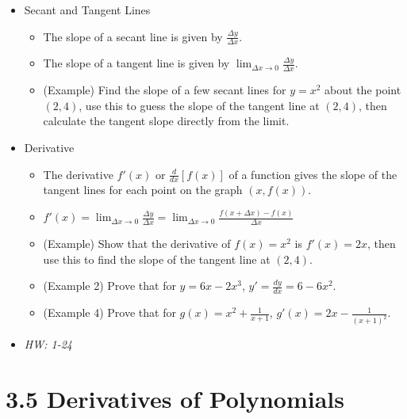 \documentclass[11pt]{article}
\begin{document}
\begin{itemize}
\item Secant and Tangent Lines
  \begin{itemize}
    \item The slope of a secant line is given by \(\frac{\Delta y}{\Delta x}\).
    \item The slope of a tangent line is given by
          \(\lim_{\Delta x\to 0}\frac{\Delta y}{\Delta x}\).
    \item (Example) Find the slope of a few secant lines for \(y=x^2\) about the
          point \((2,4)\), use this to guess the slope of the tangent line
          at \((2,4)\), then calculate the tangent slope directly from the limit.
  \end{itemize}
\item Derivative
  \begin{itemize}
    \item The derivative \(f'(x)\) or \(\frac{d}{dx}[f(x)]\) of a function
          gives the slope of the tangent lines for each point on the graph
          \((x,f(x))\).
    \item \(f'(x)=\lim_{\Delta x\to 0}\frac{\Delta y}{\Delta x}=
            \lim_{\Delta x\to 0}\frac{f(x+\Delta x)-f(x)}{\Delta x}\)
    \item (Example) Show that the derivative of \(f(x)=x^2\)
          is \(f'(x)=2x\), then use this to find the slope of the tangent
          line at \((2,4)\).
    \item (Example 2) Prove that for \(y=6x-2x^3\), \(y'=\frac{dy}{dx}=6-6x^2\).
    \item (Example 4) Prove that for \(g(x)=x^2+\frac{1}{x+1}\),
          \(g'(x)=2x-\frac{1}{(x+1)^2}\).
  \end{itemize}

\item\textit{
  HW: 1-24
}
\end{itemize}

\section*{3.5 Derivatives of Polynomials}
\end{document}
